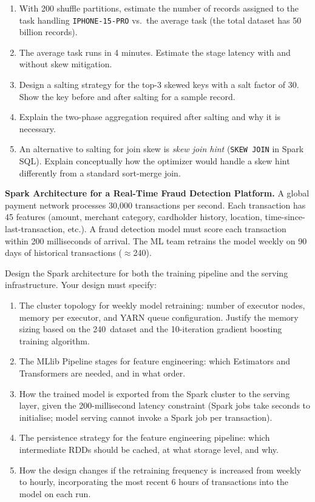 \begin{enumerate}[label=(\alph*)]
  \item With 200 shuffle partitions, estimate the number of records
        assigned to the task handling \texttt{IPHONE-15-PRO} vs.\ the
        average task (the total dataset has 50 billion records).
  \item The average task runs in 4 minutes. Estimate the stage
        latency with and without skew mitigation.
  \item Design a salting strategy for the top-3 skewed keys with a
        salt factor of 30. Show the key before and after salting for
        a sample record.
  \item Explain the two-phase aggregation required after salting and
        why it is necessary.
  \item An alternative to salting for join skew is \emph{skew join
        hint} (\texttt{SKEW JOIN} in Spark SQL). Explain conceptually
        how the optimizer would handle a skew hint differently from a
        standard sort-merge join.
\end{enumerate}

\bigskip
{}

\dpr \textbf{Spark Architecture for a Real-Time Fraud Detection Platform.}
A global payment network processes 30{,}000 transactions per second.
Each transaction has 45 features (amount, merchant category, cardholder
history, location, time-since-last-transaction, etc.). A fraud detection
model must score each transaction within 200 milliseconds of arrival.
The ML team retrains the model weekly on 90 days of historical
transactions ($\approx$240\TB).

Design the Spark architecture for both the training pipeline and the
serving infrastructure. Your design must specify:

\begin{enumerate}[label=(\alph*)]
  \item The cluster topology for weekly model retraining: number of
        executor nodes, memory per executor, and YARN queue configuration.
        Justify the memory sizing based on the 240\TB\ dataset and the
        10-iteration gradient boosting training algorithm.
  \item The MLlib Pipeline stages for feature engineering: which
        Estimators and Transformers are needed, and in what order.
  \item How the trained model is exported from the Spark cluster to
        the serving layer, given the 200-millisecond latency constraint
        (Spark jobs take seconds to initialise; model serving cannot
        invoke a Spark job per transaction).
  \item The persistence strategy for the feature engineering pipeline:
        which intermediate RDDs should be cached, at what storage level,
        and why.
  \item How the design changes if the retraining frequency is increased
        from weekly to hourly, incorporating the most recent 6 hours of
        transactions into the model on each run.
\end{enumerate}

